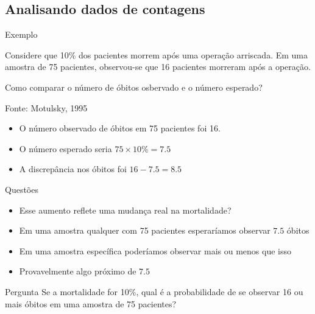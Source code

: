 \documentclass{beamer}
\begin{document}

\subsection{Analisando dados de contagens}

\begin{frame}{Exemplo}
  \begin{example}
    Considere que 10\% dos pacientes morrem após uma operação
    arriscada. Em uma amostra de 75 pacientes, observou-se que 16
    pacientes morreram após a operação.

    Como comparar o número de óbitos osbervado e o número esperado?

    Fonte: Motulsky, 1995
  \end{example}
  \begin{itemize}
  \item O número observado de óbitos em 75 pacientes foi 16.
  \item O número esperado seria $75 \times 10\% = 7.5$
  \item A discrepância nos óbitos foi $16-7.5 = 8.5$
  \end{itemize}
\end{frame}

\begin{frame}{Questões}
  \begin{itemize}
  \item Esse aumento reflete uma mudança real na mortalidade?
  \item Em uma amostra qualquer com 75 pacientes esperaríamos observar $7.5$ óbitos
  \item Em uma amostra específica poderíamos observar mais ou menos
    que isso
  \item Provavelmente algo próximo de $7.5$
  \end{itemize}

  \begin{block}{Pergunta}
    Se a mortalidade for 10\%, qual é a probabilidade de se observar
    16 ou mais óbitos em uma amostra de 75 pacientes?
  \end{block}
\end{frame}
\end{document}
